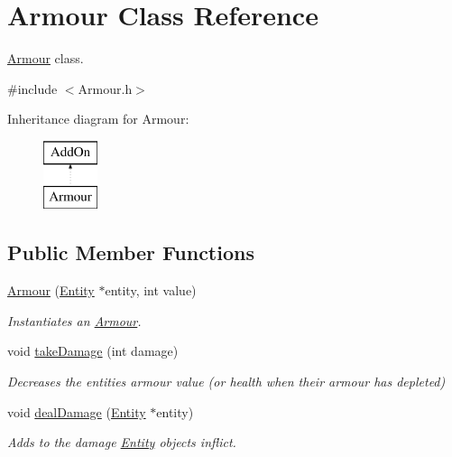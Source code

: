 \hypertarget{classArmour}{}\section{Armour Class Reference}
\label{classArmour}


\hyperlink{classArmour}{Armour} class.  




{\ttfamily \#include $<$Armour.\+h$>$}

Inheritance diagram for Armour\+:\begin{figure}[H]
\begin{center}
\leavevmode
\includegraphics[height=2.000000cm]{classArmour}
\end{center}
\end{figure}
\subsection*{Public Member Functions}
\begin{DoxyCompactItemize}
\item 
\hyperlink{classArmour_a795c5149e3e502530926aff4a6ade971}{Armour} (\hyperlink{classEntity}{Entity} $\ast$entity, int value)
\begin{DoxyCompactList}\small\item\em Instantiates an \hyperlink{classArmour}{Armour}. \end{DoxyCompactList}\item 
void \hyperlink{classArmour_a7a52bd8473173c81a4ba8a6373513581}{take\+Damage} (int damage)
\begin{DoxyCompactList}\small\item\em Decreases the entities\textquotesingle{} armour value (or health when their armour has depleted) \end{DoxyCompactList}\item 
void \hyperlink{classArmour_acce6c768aaebaa559ac063e9d67c53b5}{deal\+Damage} (\hyperlink{classEntity}{Entity} $\ast$entity)
\begin{DoxyCompactList}\small\item\em Adds to the damage \hyperlink{classEntity}{Entity} objects inflict. \end{DoxyCompactList}\end{DoxyCompactItemize}


